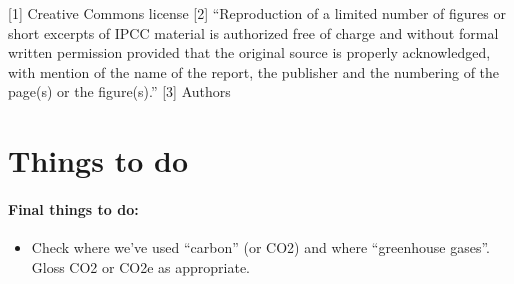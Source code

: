 \documentclass[12pt]{article}
\begin{document}
[1] Creative Commons license
[2] ``Reproduction of a limited number of figures or short excerpts of IPCC material is authorized free of charge and without formal written permission provided that the original source is properly acknowledged, with mention of the name of the report, the publisher and the numbering of the page(s) or the figure(s).''
[3] Authors


\section*{Things to do}

\paragraph*{Final things to do:}
\begin{itemize}
\item 
Check where we’ve used ``carbon'' (or CO2) and where ``greenhouse gases''.  Gloss CO2 or CO2e as appropriate.
\end{itemize}
\end{document}
